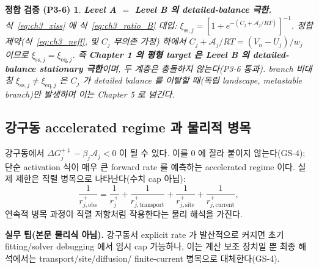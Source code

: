 \documentclass[11pt,a4paper]{article}
\newtheorem*{verifybox}{정합 검증 (P3-6)}
\newcommand{\eq}{\mathrm{eq}}
\newcommand{\sstat}{\mathrm{ss}}
\begin{document}
\begin{verifybox}
\textbf{Level A $=$ Level B 의 detailed-balance 극한.} 식~\eqref{eq:ch3_xiss} 에 식~\eqref{eq:ch3_ratio_B}
대입: $\xi_{\sstat,j}=[1+e^{-(C_j+\mathcal A_j/RT)}]^{-1}$. 정합 제약(식~\eqref{eq:ch3_neff}, 및 $C_j$ 무의존
가정) 하에서 $C_j+\mathcal A_j/RT=(V_n-U_j)/w_j$ 이므로 $\xi_{\sstat,j}=\xi_{\eq,j}$. 즉 \textbf{Chapter 1 의 평형 target
은 Level B 의 detailed-balance stationary 극한}이며, 두 계층은 충돌하지 않는다(P3-6 통과). branch 비대칭
$\xi_{\sstat,j}\ne\xi_{\eq,j}$ 은 $C_j$ 가 detailed balance 를 이탈할 때(독립 landscape, metastable branch)만
발생하며 이는 Chapter 5 로 넘긴다.
\end{verifybox}

\subsection{강구동 accelerated regime 과 물리적 병목}
강구동에서 $\Delta G_j^{+\ddagger}-\beta_j\mathcal A_j<0$ 이 될 수 있다. 이를 0 에 잘라 붙이지 않는다(GS-4);
단순 activation 식이 매우 큰 forward rate 를 예측하는 accelerated regime 이다. 실제 제한은 직렬 병목으로
나타난다(수치 cap 아님):
\begin{equation}
\frac{1}{r_{j,\mathrm{obs}}^+}=\frac{1}{r_j^+}+\frac{1}{r_{j,\mathrm{transport}}^+}+\frac{1}{r_{j,\mathrm{site}}^+}+\frac{1}{r_{j,\mathrm{current}}^+},
\label{eq:ch3_forward_limiter}
\end{equation}
연속적 병목 과정이 직렬 저항처럼 작용한다는 물리 해석을 가진다.
\begin{mdframed}
\textbf{실무 팁(본문 물리식 아님).} 강구동서 explicit rate 가 발산적으로 커지면 초기 fitting/solver
debugging 에서 임시 cap 가능하나, 이는 계산 보조 장치일 뿐 최종 해석에서는 transport/site/diffusion/
finite-current 병목으로 대체한다(GS-4).
\end{mdframed}

\end{document}
